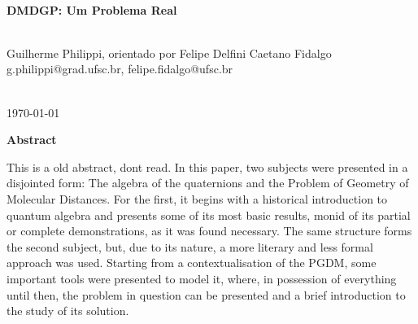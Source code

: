 \documentclass[a4paper,12pt]{article}
\begin{document}
\begin{titlepage}
		
		\HRule \\[0.4cm]
		{ \LARGE \bfseries DMDGP: Um Problema Real} \\ [0.4cm] %
		\HRule \\[2.5cm]
		
		
		\begin{minipage}{1\textwidth}
			\begin{center} \large
				Guilherme Philippi, orientado por Felipe Delfini Caetano Fidalgo
				\\g.philippi@grad.ufsc.br, felipe.fidalgo@ufsc.br 
			\end{center}
		\end{minipage} \\[2cm]
		
		
		{\large \today} %
		
		
		\vfill %
		
	\end{titlepage}
	
	
	\newpage
	\tableofcontents
	\newpage
	
	\begin{center}
		\large
		\textbf{Abstract}
	\end{center}
	
	This is a old abstract, dont read. In this paper, two subjects were presented in a disjointed form: The algebra of
	the quaternions and the Problem of Geometry of Molecular Distances. For the first,
	it begins with a historical introduction to quantum algebra and presents some of its	most basic results, monid of its partial or complete demonstrations, as it was found necessary. The same structure forms the second subject, but, due to its nature, a more literary and less formal approach was used. Starting from a contextualisation of the PGDM, some important tools were presented to model it, where, in possession of everything until then, the problem in question can be presented and a brief introduction to the study of its solution.
 
\end{document}
